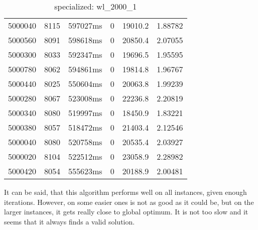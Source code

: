 \documentclass[./main.tex]{subfiles}
\begin{document}
\begin{table}
\begin{tabular}{ c | c | c | c | c | c }
        \hline
        5000040 & 8115 & 597027ms & 0 & 19010.2 & 1.88782 \\
        5000560 & 8091 & 598618ms & 0 & 20850.4 & 2.07055 \\
        5000300 & 8033 & 592347ms & 0 & 19696.5 & 1.95595 \\
        5000780 & 8062 & 594861ms & 0 & 19814.8 & 1.96767 \\
        5000440 & 8025 & 550604ms & 0 & 20063.8 & 1.99239 \\
        5000280 & 8067 & 523008ms & 0 & 22236.8 & 2.20819 \\
        5000340 & 8080 & 519997ms & 0 & 18450.9 & 1.83221 \\
        5000380 & 8057 & 518472ms & 0 & 21403.4 & 2.12546 \\
        5000040 & 8080 & 520758ms & 0 & 20535.4 & 2.03927 \\
        5000020 & 8104 & 522512ms & 0 & 23058.9 & 2.28982 \\
        \rowcolor{lightgray} 5000420 & 8054 & 555623ms & 0 & 20188.9 & 2.00481 \\
    \end{tabular}
    \caption{specialized: wl\_2000\_1}
\end{table}

It can be said, that this algorithm performs well on all instances, given enough iterations.
However, on some easier ones is not as good as it could be, but on the larger instances, it gets really close to global optimum.
It is not too slow and it seems that it always finds a valid solution.
\end{document}
